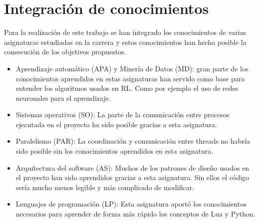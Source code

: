 \chapter{Integración de conocimientos}

Para la realización de este trabajo se han integrado los conocimientos de varias asignaturas estudiadas en la carrera y estos conocimientos han hecho posible la consecución de los objetivos propuestos.

\begin{itemize}
    \item Aprendizaje automático (APA) y Minería de Datos (MD): gran parte de los conocimientos aprendidos en estas asignaturas han servido como base para entender los algoritmos usados en RL. Como por ejemplo el uso de redes neuronales para el aprendizaje.
    \item Sistemas operativos (SO): La parte de la comunicación entre procesos ejecutada en el proyecto ha sido posible gracias a esta asignatura.
    \item Paralelismo (PAR): La coordinación y comunicación entre threads no habría sido posible sin los conocimientos aprendidos en esta asignatura.
    \item Arquitectura del software (AS): Muchos de los patrones de diseño usados en el proyecto han sido aprendidos gracias a esta asignatura. Sin ellos el código sería mucho menos legible y más complicado de modificar.
    \item Lenguajes de programación (LP): Esta asignatura aportó los conocimientos necesarios para aprender de forma más rápido los conceptos de Lua y Python.
\end{itemize}


